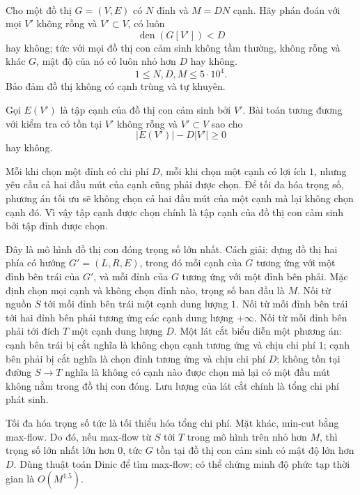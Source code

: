 \documentclass[11pt]{article}
\begin{document}
\paragraph{}
Cho một đồ thị \(G=(V,E)\) có \(N\) đỉnh và \(M=DN\) cạnh. Hãy phán đoán với
mọi \(V'\) không rỗng và \(V'\subset V\), có luôn
\[
  \operatorname{den}(G[V'])<D
\]
hay không; tức với mọi đồ thị con cảm sinh không tầm thường, không rỗng và
khác \(G\), mật độ của nó có luôn nhỏ hơn \(D\) hay không.
\[
  1\le N,D,M\le5\cdot10^4.
\]
Bảo đảm đồ thị không có cạnh trùng và tự khuyên.

Gọi \(E(V')\) là tập cạnh của đồ thị con cảm sinh bởi \(V'\). Bài toán tương
đương với kiểm tra có tồn tại \(V'\) không rỗng và \(V'\subset V\) sao cho
\[
  |E(V')|-D|V'|\ge0
\]
hay không.

Mỗi khi chọn một đỉnh có chi phí \(D\), mỗi khi chọn một cạnh có lợi ích \(1\),
nhưng yêu cầu cả hai đầu mút của cạnh cũng phải được chọn. Để tối đa hóa trọng
số, phương án tối ưu sẽ không chọn cả hai đầu mút của một cạnh mà lại không
chọn cạnh đó. Vì vậy tập cạnh được chọn chính là tập cạnh của đồ thị con cảm
sinh bởi tập đỉnh được chọn.

Đây là mô hình đồ thị con đóng trọng số lớn nhất. Cách giải: dựng đồ thị hai
phía có hướng \(G'=(L,R,E)\), trong đó mỗi cạnh của \(G\) tương ứng với một
đỉnh bên trái của \(G'\), và mỗi đỉnh của \(G\) tương ứng với một đỉnh bên
phải. Mặc định chọn mọi cạnh và không chọn đỉnh nào, trọng số ban đầu là \(M\).
Nối từ nguồn \(S\) tới mỗi đỉnh bên trái một cạnh dung lượng \(1\). Nối từ mỗi
đỉnh bên trái tới hai đỉnh bên phải tương ứng các cạnh dung lượng \(+\infty\).
Nối từ mỗi đỉnh bên phải tới đích \(T\) một cạnh dung lượng \(D\). Một lát cắt
biểu diễn một phương án: cạnh bên trái bị cắt nghĩa là không chọn cạnh tương
ứng và chịu chi phí \(1\); cạnh bên phải bị cắt nghĩa là chọn đỉnh tương ứng và
chịu chi phí \(D\); không tồn tại đường \(S\to T\) nghĩa là không có cạnh nào
được chọn mà lại có một đầu mút không nằm trong đồ thị con đóng. Lưu lượng của
lát cắt chính là tổng chi phí phát sinh.

Tối đa hóa trọng số tức là tối thiểu hóa tổng chi phí. Mặt khác, min-cut bằng
max-flow. Do đó, nếu max-flow từ \(S\) tới \(T\) trong mô hình trên nhỏ hơn
\(M\), thì trọng số lớn nhất lớn hơn \(0\), tức \(G\) tồn tại đồ thị con cảm
sinh có mật độ lớn hơn \(D\). Dùng thuật toán Dinic để tìm max-flow; có thể
chứng minh độ phức tạp thời gian là \(O(M^{1.5})\).
\end{document}
